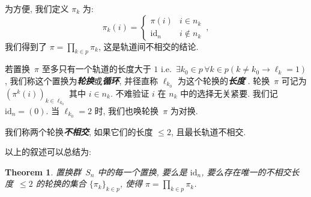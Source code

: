 \documentclass[openany]{ctexbook}
\newcommand*{\indexbf}[1]{\emph{\textbf{#1}}\index{#1}} %
\theoremstyle{plain}
\newtheorem{theorem}{Theorem}[section] %
\theoremstyle{definition}
\newcommand*{\id}{\mathrm{id}} %
\newcommand{\emphbf}[1]{\emph{\textbf{#1}}}
\begin{document}
为方便, 我们定义 $\pi_k$ 为:
\begin{equation*}
	\pi_k(i) = 
	\begin{cases}
		\pi(i) & i \in n_k \\
		\id_n & i \notin n_k
	\end{cases}\,,
\end{equation*}
我们得到了 $\pi = \prod_{k \in p} \pi_k$, 这是轨道间不相交的结论.

若置换~$\pi$ 至多只有一个轨道的长度大于 $1$ i.e.\ $
	\exists k_0 \in p \,\forall k \in p (k \neq k_0 \to \ell_k = 1)
$,  我们称这个置换为\indexbf{轮换}或\indexbf{循环}, 并径直称 $\ell_{k_0}$ 为这个轮换的\emphbf{长度}%
	.
轮换~$\pi$ 可记为 $(\pi^k (i))_{k \in \ell_{k_0}}$ 其中 $i \in n_k$. 不难验证 $i$ 在 $n_k$ 中的选择无关紧要. 我们记 $\id_n = (0)$. 
当 $\ell_{k_0} = 2 $ 时, 我们也唤轮换~$\pi$ 为对换.

我们称两个轮换\indexbf{不相交}, 如果它们的长度 $\leq 2$, 且最长轨道不相交.

以上的叙述可以总结为:
\begin{theorem}\label{theorem: 置换的轮换分解}
	置换群~$S_n$ 中的每一个置换, 要么是 $\id_n$, 要么存在唯一的不相交长度~$\leq 2$ 的轮换的集合 $\{\pi_k\}_{k \in p}$, 使得 $\pi = \prod_{k \in p} \pi_k$.
\end{theorem}
\end{document}

